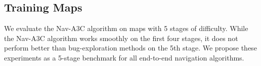 \subsection{Training Maps}
\label{sec:navtasks}
We evaluate the Nav-A3C algorithm on maps with 5 stages of difficulty. While the Nav-A3C algorithm works smoothly on the first four stages, it does not perform better than bug-exploration methods on the 5th stage.
We propose these experiments as a 5-stage benchmark for all end-to-end navigation algorithms.


